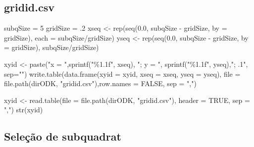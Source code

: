 \documentclass[
  letterpaper,
]{report}
\newenvironment{Shaded}{\begin{snugshade}}{\end{snugshade}}
\newcommand{\AttributeTok}[1]{\textcolor[rgb]{0.40,0.45,0.13}{#1}}
\newcommand{\ConstantTok}[1]{\textcolor[rgb]{0.56,0.35,0.01}{#1}}
\newcommand{\DecValTok}[1]{\textcolor[rgb]{0.68,0.00,0.00}{#1}}
\newcommand{\FloatTok}[1]{\textcolor[rgb]{0.68,0.00,0.00}{#1}}
\newcommand{\FunctionTok}[1]{\textcolor[rgb]{0.28,0.35,0.67}{#1}}
\newcommand{\NormalTok}[1]{\textcolor[rgb]{0.00,0.23,0.31}{#1}}
\newcommand{\OtherTok}[1]{\textcolor[rgb]{0.00,0.23,0.31}{#1}}
\newcommand{\SpecialCharTok}[1]{\textcolor[rgb]{0.37,0.37,0.37}{#1}}
\newcommand{\StringTok}[1]{\textcolor[rgb]{0.13,0.47,0.30}{#1}}
\begin{document}
\subsection{gridid.csv}\label{gridid.csv}

\begin{Shaded}
\begin{Highlighting}[]
\NormalTok{subqSize }\OtherTok{=} \DecValTok{5}
\NormalTok{gridSize }\OtherTok{=}\NormalTok{ .}\DecValTok{2}
\NormalTok{xseq }\OtherTok{\textless{}{-}}  \FunctionTok{rep}\NormalTok{(}\FunctionTok{seq}\NormalTok{(}\FloatTok{0.0}\NormalTok{, subqSize }\SpecialCharTok{{-}}\NormalTok{ gridSize, }\AttributeTok{by =}\NormalTok{ gridSize), }\AttributeTok{each =}\NormalTok{ subqSize}\SpecialCharTok{/}\NormalTok{gridSize)}
\NormalTok{yseq }\OtherTok{\textless{}{-}}  \FunctionTok{rep}\NormalTok{(}\FunctionTok{seq}\NormalTok{(}\FloatTok{0.0}\NormalTok{, subqSize }\SpecialCharTok{{-}}\NormalTok{ gridSize, }\AttributeTok{by =}\NormalTok{ gridSize), subqSize}\SpecialCharTok{/}\NormalTok{gridSize)}

\NormalTok{xyid  }\OtherTok{\textless{}{-}}  \FunctionTok{paste}\NormalTok{(}\StringTok{"x = "}\NormalTok{,}\FunctionTok{sprintf}\NormalTok{(}\StringTok{"\%1.1f"}\NormalTok{, xseq), }\StringTok{"; y = "}\NormalTok{, }\FunctionTok{sprintf}\NormalTok{(}\StringTok{"\%1.1f"}\NormalTok{, yseq),}\StringTok{"; .1"}\NormalTok{, }\AttributeTok{sep=}\StringTok{""}\NormalTok{)}
\FunctionTok{write.table}\NormalTok{(}\FunctionTok{data.frame}\NormalTok{(}\AttributeTok{xyid =}\NormalTok{ xyid, }\AttributeTok{xseq =}\NormalTok{ xseq, }\AttributeTok{yseq =}\NormalTok{ yseq), }\AttributeTok{file =} \FunctionTok{file.path}\NormalTok{(dirODK, }\StringTok{"gridid.csv"}\NormalTok{),}\AttributeTok{row.names =} \ConstantTok{FALSE}\NormalTok{, }\AttributeTok{sep =} \StringTok{","}\NormalTok{)}

\NormalTok{xyid }\OtherTok{\textless{}{-}} \FunctionTok{read.table}\NormalTok{(}\AttributeTok{file =} \FunctionTok{file.path}\NormalTok{(dirODK, }\StringTok{"gridid.csv"}\NormalTok{), }\AttributeTok{header =} \ConstantTok{TRUE}\NormalTok{, }\AttributeTok{sep =} \StringTok{","}\NormalTok{)}
\FunctionTok{str}\NormalTok{(xyid)}
\end{Highlighting}
\end{Shaded}

\subsection{Seleção de subquadrat}\label{seleuxe7uxe3o-de-subquadrat}
\end{document}
